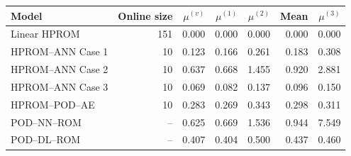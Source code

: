 \begin{tabular}{lr|rrrr|r}
\toprule
Model & Online size & $\mu^{(v)}$ & $\mu^{(1)}$ & $\mu^{(2)}$ & Mean & $\mu^{(3)}$ \\
\midrule
Linear HPROM & 151 & 0.000 & 0.000 & 0.000 & 0.000 & 0.000 \\
HPROM--ANN Case 1 & 10 & 0.123 & 0.166 & 0.261 & 0.183 & 0.308 \\
HPROM--ANN Case 2 & 10 & 0.637 & 0.668 & 1.455 & 0.920 & 2.881 \\
HPROM--ANN Case 3 & 10 & 0.069 & 0.082 & 0.137 & 0.096 & 0.150 \\
HPROM--POD--AE & 10 & 0.283 & 0.269 & 0.343 & 0.298 & 0.311 \\
\midrule
POD--NN--ROM & -- & 0.625 & 0.669 & 1.536 & 0.944 & 7.549 \\
POD--DL--ROM & -- & 0.407 & 0.404 & 0.500 & 0.437 & 0.460 \\
\bottomrule
\end{tabular}
